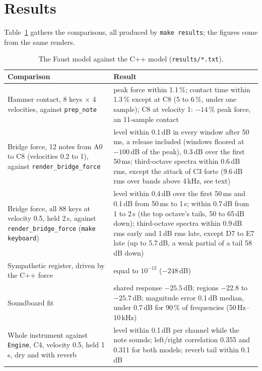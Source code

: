 \documentclass[10pt,a4paper,twocolumn]{article}
\newcommand{\code}[1]{\texttt{#1}}
\begin{document}
\section{Results}
\label{sec:results}

Table~\ref{tab:results} gathers the comparisons, all produced by \code{make results}; the figures come from the same renders.

\begin{table}[t]
\centering
\small
\begin{tabular}{p{}p{}}
\toprule
Comparison & Result \\
\midrule
Hammer contact, 8 keys $\times$ 4 velocities, against \code{prep\_note} & peak force within 1.1\,\%; contact time within 1.3\,\% except at C8 (5 to 6\,\%, under one sample); C8 at velocity 1: $-14$\,\% peak force, an 11-sample contact \\
Bridge force, 12 notes from A0 to C8 (velocities 0.2 to 1), against \code{render\_bridge\_force} & level within 0.1\,dB in every window after 50\,ms, a release included (windows floored at $-100$\,dB of the peak), 0.3\,dB over the first 50\,ms; third-octave spectra within 0.6\,dB rms, except the attack of C3 forte (9.6\,dB rms over bands above 4\,kHz, see text) \\
Bridge force, all 88 keys at velocity 0.5, held 2\,s, against \code{render\_bridge\_force} (\code{make keyboard}) & level within 0.4\,dB over the first 50\,ms and 0.1\,dB from 50\,ms to 1\,s; within 0.7\,dB from 1 to 2\,s (the top octave's tails, 50 to 65\,dB down); third-octave spectra within 0.9\,dB rms early and 1\,dB rms late, except D7 to E7 late (up to 5.7\,dB, a weak partial of a tail 58\,dB down) \\
Sympathetic register, driven by the C++ force & equal to $10^{-12}$ ($-248$\,dB) \\
Soundboard fit & shared response $-25.5$\,dB; regions $-22.8$ to $-25.7$\,dB; magnitude error 0.1\,dB median, under 0.7\,dB for 90\,\% of frequencies (50\,Hz--10\,kHz) \\
Whole instrument against \code{Engine}, C4, velocity 0.5, held 1\,s, dry and with reverb & level within 0.1\,dB per channel while the note sounds; left/right correlation 0.355 and 0.311 for both models; reverb tail within 0.1\,dB \\
\bottomrule
\end{tabular}
\caption{The Faust model against the C++ model (\code{results/*.txt}).}
\label{tab:results}
\end{table}
\end{document}
